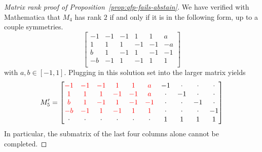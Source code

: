 \documentclass[final]{colt2020} %
\newcommand{\Comments}{1}
\newcommand{\mynote}[2]{\ifnum\Comments=1\textcolor{#1}{#2}\fi}
\newcommand{\jessie}[1]{\mynote{purple}{[JF: #1]}}
\newcommand{\bo}[1]{\mynote{blue}{[Bo: #1]}}
\newcommand{\abstain}[1]{\mathrm{abstain}_{#1}}
\begin{document}
\begin{proof}[Matrix rank proof of Proposition~\ref{prop:qfp-fails-abstain}]
        We have verified with Mathematica that $M_4$ has rank $2$ if and only if it is in the following form, up to a couple symmetries.
	\[
	\begin{bmatrix}
	-1 & -1 & -1 & 1 & 1 & a \\
	1 & 1 & 1 & -1 & -1 & -a \\
	b & 1 & -1 & 1 & -1 & -1 \\
	-b & -1 & 1 & -1 & 1 & 1 \\
	\end{bmatrix}
	\] with $a, b \in [-1,1]$.
	Plugging in this solution set into the larger matrix yields
	\[
        M_5' =
	\begin{bmatrix}
	{\color{red} -1} & {\color{red} -1} & {\color{red} -1} & {\color{red} 1} & {\color{red} 1} & {\color{red} a} & -1 & \cdot & \cdot & \cdot \\
	{\color{red} 1} & {\color{red} 1} & {\color{red} 1} & {\color{red} -1} & {\color{red} -1} & {\color{red} a} & \cdot & -1 & \cdot & \cdot \\
	{\color{red} b} & {\color{red} 1} & {\color{red} -1} & {\color{red} 1} & {\color{red} -1} & {\color{red} -1} & \cdot & \cdot & -1 & \cdot \\
	{\color{red} -b} & {\color{red} -1} & {\color{red} 1} & {\color{red} -1} & {\color{red} 1} & {\color{red} 1} & \cdot & \cdot & \cdot & -1 \\
	\cdot & \cdot & \cdot & \cdot & \cdot & \cdot & 1 & 1 & 1 & 1\\
	\end{bmatrix}
	\]
 In particular, the submatrix of the last four columns alone cannot be completed.
	
\end{proof}



\end{document}
